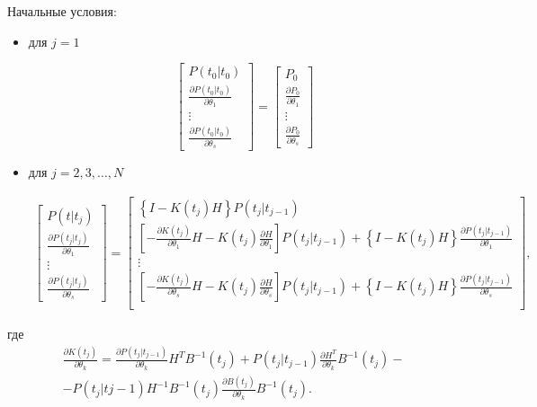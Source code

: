 \documentclass[a4paper,14pt]{extarticle}
\begin{document}
\newpage
Начальные условия:
\begin{itemize}

	\item для $j = 1$

\begin{equation}
\label{eq:senscovinitcond1}
\begin{bmatrix}
	P(t_0|t_0) \\
	\frac{\partial P(t_0|t_0)}{\partial \theta_1} \\
	\vdots \\
	\frac{\partial P(t_0|t_0)}{\partial \theta_s}
\end{bmatrix} =
\begin{bmatrix}
	P_0 \\
	\frac{\partial P_0}{\partial \theta_1} \\
	\vdots \\
	\frac{\partial P_0}{\partial \theta_s}
\end{bmatrix}
\end{equation}

\item для $j = 2, 3, \ldots, N$

\begin{multline}
\label{eq:senscovinitcondj}
\begin{bmatrix}
	P(t|t_j) \\
	\frac{\partial P(t_j|t_j)}{\partial \theta_1} \\
 	\vdots \\
	\frac{\partial P(t_j|t_j)}{\partial \theta_s}
\end{bmatrix} =
\begin{bmatrix}
	\left\{ I - K(t_j) H \right\} P(t_j|t_{j-1}) \\
	\left[ - \frac{\partial K(t_j)}{\partial \theta_1} H - K(t_j)
		\frac{\partial H}{\partial \theta_1} \right] P(t_j|t_{j-1}) + 
		\left\{ I - K(t_j) H \right\}
		\frac{\partial P(t_j|t_{j-1})}{\partial \theta_1} \\
	\vdots \\
	\left[ - \frac{\partial K(t_j)}{\partial \theta_s} H - K(t_j)
		\frac{\partial H}{\partial \theta_s} \right] P(t_j|t_{j-1}) + 
		\left\{ I - K(t_j) H \right\}
		\frac{\partial P(t_j|t_{j-1})}{\partial \theta_s} \\
\end{bmatrix},
\end{multline}

\end{itemize}

где
\begin{multline}
	\frac{\partial K(t_j)}{\partial \theta_k} =
		\frac{\partial P(t_j|t_{j-1})}{\partial \theta_k} H^T B^{-1}(t_j) + 
		P(t_j|t_{j-1}) \frac{\partial H^T}{\partial \theta_k} B^{-1}(t_j) - \\ -
		P(t_j|t{j-1}) H^{-1} B^{-1}(t_j) \frac{\partial B(t_j)}{\partial \theta_k}
		B^{-1}(t_j).
\end{multline}
\end{document}
